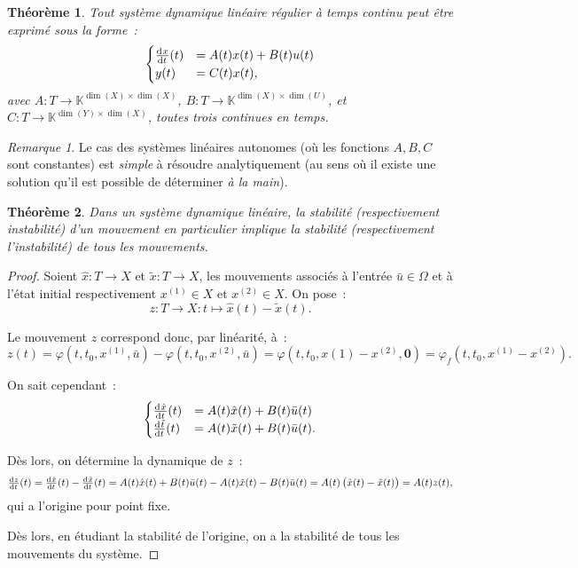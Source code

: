 \documentclass{article}
\newtheorem{thm}{Théorème}[section]
\theoremstyle{definition}
\theoremstyle{remark}
\newtheorem*{rmq}{Remarque}
\newcommand{\K}{\mathbb K}
\begin{document}
	\begin{thm} Tout système dynamique linéaire régulier à temps continu peut être exprimé sous la forme~:
	\begin{align}
		\begin{cases}
			\od xt(t) &= A(t)x(t) + B(t)u(t) \\
			y(t) &= C(t)x(t),
		\end{cases}
	\end{align}
	avec $A : T \to \K^{\dim(X) \times \dim(X)}$, $B : T \to \K^{\dim(X) \times \dim(U)}$, et $C : T \to \K^{\dim(Y) \times \dim(X)}$, toutes trois continues
	en temps.
	\end{thm}

	\begin{rmq} Le cas des systèmes linéaires autonomes (où les fonctions $A, B, C$ sont constantes) est \textit{simple} à résoudre analytiquement (au sens où
	il existe une solution qu'il est possible de déterminer \textit{à la main}).
	\end{rmq}

	\begin{thm} Dans un système dynamique linéaire, la stabilité (respectivement instabilité) d'un mouvement en particulier implique la stabilité (respectivement
	l'instabilité) de tous les mouvements.
	\end{thm}

	\begin{proof} Soient $\hat x : T \to X$ et $\tilde x : T \to X$, les mouvements associés à l'entrée $\bar u \in \Omega$ et à l'état initial respectivement
	$x^{(1)} \in X$ et $x^{(2)} \in X$. On pose~:
	\[z : T \to X : t \mapsto \hat x(t) - \tilde x(t).\]

	Le mouvement $z$ correspond donc, par linéarité, à~:
	\[z(t) = \varphi(t, t_0, x^{(1)}, \bar u) - \varphi(t, t_0, x^{(2)}, \bar u) = \varphi(t, t_0, x{(1)}-x^{(2)}, \mathbf{0}) = \varphi_f(t, t_0, x^{(1)}-x^{(2)}).\]

	On sait cependant~:
	\[\begin{cases}
		\od {\hat x}t(t) &= A(t)\hat x(t) + B(t)\bar u(t) \\
		\od {\tilde t}t(t) &= A(t)\tilde x(t) + B(t)\bar u(t).
	\end{cases}\]

	Dès lors, on détermine la dynamique de $z$~:
	\[\od zt(t) = \od {\hat x}t(t) - \od {\tilde x}t(t) = A(t)\hat x(t) + B(t)\bar u(t) - A(t)\tilde x(t) - B(t)\bar u(t) = A(t)\left(\hat x(t) - \tilde x(t)\right) = A(t)z(t),\]
	qui a l'origine pour point fixe.

	Dès lors, en étudiant la stabilité de l'origine, on a la stabilité de tous les mouvements du système.
	\end{proof}
\end{document}
